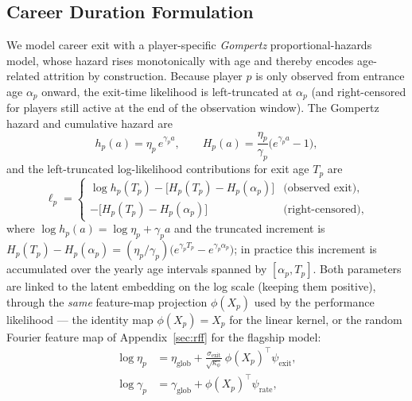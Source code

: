 \subsection{Career Duration Formulation}
\label{sec:survival_linear_map}
We model career exit with a player-specific \emph{Gompertz} proportional-hazards model, whose hazard rises monotonically with age and thereby encodes age-related attrition by construction.  Because player $p$ is only observed from entrance age $\alpha_p$ onward, the exit-time likelihood is left-truncated at $\alpha_p$ (and right-censored for players still active at the end of the observation window).  The Gompertz hazard and cumulative hazard are
\begin{equation}
    h_p(a) = \eta_p\,e^{\gamma_p a}, \qquad
    H_p(a) = \frac{\eta_p}{\gamma_p}\bigl(e^{\gamma_p a} - 1\bigr),
\end{equation}
and the left-truncated log-likelihood contributions for exit age $T_p$ are
\begin{equation}
    \ell_p =
    \begin{cases}
        \log h_p(T_p) - \bigl[H_p(T_p) - H_p(\alpha_p)\bigr] & \text{(observed exit)}, \\
        -\bigl[H_p(T_p) - H_p(\alpha_p)\bigr] & \text{(right-censored)},
    \end{cases}
    \label{eq:surv_lik}
\end{equation}
where $\log h_p(a) = \log\eta_p + \gamma_p a$ and the truncated increment is $H_p(T_p) - H_p(\alpha_p) = (\eta_p/\gamma_p)\bigl(e^{\gamma_p T_p} - e^{\gamma_p \alpha_p}\bigr)$; in practice this increment is accumulated over the yearly age intervals spanned by $[\alpha_p, T_p]$.  Both parameters are linked to the latent embedding on the log scale (keeping them positive), through the \emph{same} feature-map projection $\phi(X_p)$ used by the performance likelihood --- the identity map $\phi(X_p) = X_p$ for the linear kernel, or the random Fourier feature map of Appendix~\ref{sec:rff} for the flagship model:
\begin{align}
    \log \eta_p   &= \eta_{\text{glob}} + \frac{\sigma_{\text{exit}}}{\sqrt{\kappa_\phi}}\,\phi(X_p)^\top \psi_{\text{exit}}, \label{eq:eta} \\
    \log \gamma_p &= \gamma_{\text{glob}} + \phi(X_p)^\top \psi_{\text{rate}}, \label{eq:gamma}
\end{align}
